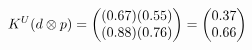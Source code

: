 \documentclass[preview]{standalone}
\begin{document}
\begin{align*}
\special{dvisvgm:raw <g id='unique000'>}K^U(d \otimes p) = \begin{pmatrix} (0.67)(0.55) \\ (0.88)(0.76) \end{pmatrix} = \begin{pmatrix} 0.37 \\ 0.66 \end{pmatrix}\special{dvisvgm:raw </g>}
\end{align*}
\end{document}
